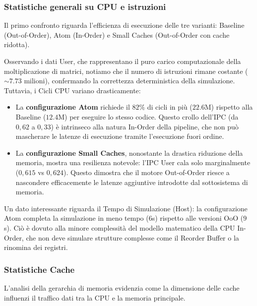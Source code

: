 \documentclass[../../main_document/main.tex]{subfiles}
\begin{document}
\subsubsection{Statistiche generali su CPU e istruzioni} Il primo confronto riguarda l'efficienza di esecuzione delle tre varianti: Baseline (Out-of-Order), Atom (In-Order) e Small Caches (Out-of-Order con cache ridotta).

\vspace{8pt}
\noindent 
Osservando i dati User, che rappresentano il puro carico computazionale della moltiplicazione di matrici, notiamo che il numero di istruzioni rimane costante ($\sim7.73$ milioni), confermando la correttezza deterministica della simulazione. Tuttavia, i Cicli CPU variano drasticamente: \begin{itemize}[leftmargin=1em]
    \item La \textbf{configurazione Atom} richiede il $82\%$ di cicli in più ($22.6$M) rispetto alla Baseline ($12.4$M) per eseguire lo stesso codice. Questo crollo dell'IPC (da $0,62$ a $0,33$) è intrinseco alla natura In-Order della pipeline, che non può mascherare le latenze di esecuzione tramite l'esecuzione fuori ordine. 
    \item La \textbf{configurazione Small Caches}, nonostante la drastica riduzione della memoria, mostra una resilienza notevole: l'IPC User cala solo marginalmente ($0,615$ vs $0,624$). Questo dimostra che il motore Out-of-Order riesce a nascondere efficacemente le latenze aggiuntive introdotte dal sottosistema di memoria. 
\end{itemize}

\vspace{8pt}
\noindent
Un dato interessante riguarda il Tempo di Simulazione (Host): la configurazione Atom completa la simulazione in meno tempo ($6$s) rispetto alle versioni OoO ($9$s). Ciò è dovuto alla minore complessità del modello matematico della CPU In-Order, che non deve simulare strutture complesse come il Reorder Buffer o la rinomina dei registri.

\subsubsection{Statistiche Cache} L'analisi della gerarchia di memoria evidenzia come la dimensione delle cache influenzi il traffico dati tra la CPU e la memoria principale.
\end{document}
